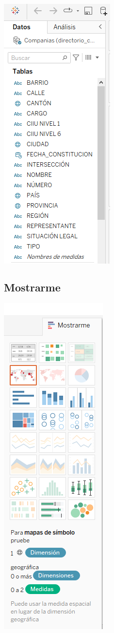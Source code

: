 \documentclass[
]{article}
\begin{document}
\includegraphics{imagenes/pr2.png}

\hypertarget{mostrarme}{%
\subsection{Mostrarme}\label{mostrarme}}

\includegraphics{imagenes/pr5.png}
\end{document}
